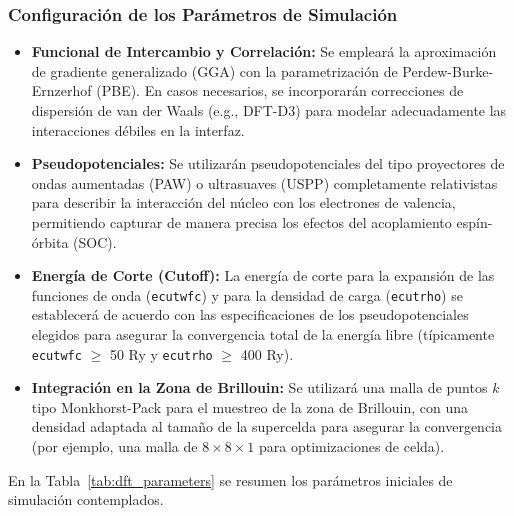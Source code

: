 \subsubsection{Configuración de los Parámetros de Simulación}
\begin{itemize}
    \item \textbf{Funcional de Intercambio y Correlación:} Se empleará la aproximación de gradiente generalizado (GGA) con la parametrización de Perdew-Burke-Ernzerhof (PBE). En casos necesarios, se incorporarán correcciones de dispersión de van der Waals (e.g., DFT-D3) para modelar adecuadamente las interacciones débiles en la interfaz.
    \item \textbf{Pseudopotenciales:} Se utilizarán pseudopotenciales del tipo proyectores de ondas aumentadas (PAW) o ultrasuaves (USPP) completamente relativistas para describir la interacción del núcleo con los electrones de valencia, permitiendo capturar de manera precisa los efectos del acoplamiento espín-órbita (SOC).
    \item \textbf{Energía de Corte (Cutoff):} La energía de corte para la expansión de las funciones de onda (\texttt{ecutwfc}) y para la densidad de carga (\texttt{ecutrho}) se establecerá de acuerdo con las especificaciones de los pseudopotenciales elegidos para asegurar la convergencia total de la energía libre (típicamente \texttt{ecutwfc} $\ge$ 50 Ry y \texttt{ecutrho} $\ge$ 400 Ry).
    \item \textbf{Integración en la Zona de Brillouin:} Se utilizará una malla de puntos $k$ tipo Monkhorst-Pack para el muestreo de la zona de Brillouin, con una densidad adaptada al tamaño de la supercelda para asegurar la convergencia (por ejemplo, una malla de $8 \times 8 \times 1$ para optimizaciones de celda).
\end{itemize}

En la Tabla~\ref{tab:dft_parameters} se resumen los parámetros iniciales de simulación contemplados.

